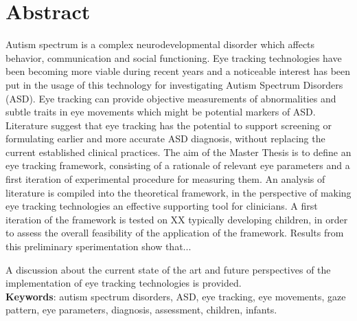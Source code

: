 \chapter*{Abstract}

Autism spectrum is a complex neurodevelopmental disorder which affects behavior, communication and social functioning. Eye tracking technologies have been becoming more viable during recent years and a noticeable interest has been put in the usage of this technology for investigating Autism Spectrum Disorders (ASD). Eye tracking can provide objective measurements of abnormalities and subtle traits in eye movements which might be potential markers of ASD. Literature suggest that eye tracking has the potential to support screening or formulating earlier and more accurate ASD diagnosis, without replacing the current established clinical practices.
The aim of the Master Thesis is to define an eye tracking framework, consisting of a rationale of relevant eye parameters and a first iteration of experimental procedure for measuring them.
An analysis of literature is compiled into the theoretical framework, in the perspective of making eye tracking technologies an effective supporting tool for clinicians. A first iteration of the framework is tested on XX typically developing children, in order to assess the overall feasibility of the application of the framework.
Results from this preliminary sperimentation show that...

A discussion about the current state of the art and future perspectives of the implementation of eye tracking technologies is provided.
\\[1cm]

\textbf{Keywords}: autism spectrum disorders, ASD, eye tracking, eye movements, gaze pattern, eye parameters, diagnosis, assessment, children, infants.

\hypersetup{pageanchor=false}